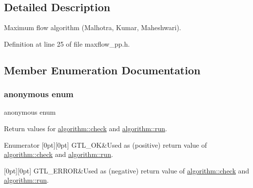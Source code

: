 \subsection{Detailed Description}
Maximum flow algorithm (Malhotra, Kumar, Maheshwari). 

Definition at line 25 of file maxflow\+\_\+pp.\+h.



\subsection{Member Enumeration Documentation}
\mbox{\label{classalgorithm_af1a0078e153aa99c24f9bdf0d97f6710}} 
\subsubsection{\texorpdfstring{anonymous enum}{anonymous enum}}
{\footnotesize\ttfamily anonymous enum\hspace{0.3cm}{\ttfamily [inherited]}}



Return values for \mbox{\hyperlink{classalgorithm_a76361fb03ad1cf643affc51821e43bed}{algorithm\+::check}} and \mbox{\hyperlink{classalgorithm_a734b189509a8d6b56b65f8ff772d43ca}{algorithm\+::run}}. 

\begin{DoxyEnumFields}{Enumerator}
[0pt][0pt]{}\mbox{\label{classalgorithm_af1a0078e153aa99c24f9bdf0d97f6710a5114c20e4a96a76b5de9f28bf15e282b}} 
G\+T\+L\+\_\+\+OK&Used as (positive) return value of \mbox{\hyperlink{classalgorithm_a76361fb03ad1cf643affc51821e43bed}{algorithm\+::check}} and \mbox{\hyperlink{classalgorithm_a734b189509a8d6b56b65f8ff772d43ca}{algorithm\+::run}}. \\
\hline

[0pt][0pt]{}\mbox{\label{classalgorithm_af1a0078e153aa99c24f9bdf0d97f6710a6fcf574690bbd6cf710837a169510dd7}} 
G\+T\+L\+\_\+\+E\+R\+R\+OR&Used as (negative) return value of \mbox{\hyperlink{classalgorithm_a76361fb03ad1cf643affc51821e43bed}{algorithm\+::check}} and \mbox{\hyperlink{classalgorithm_a734b189509a8d6b56b65f8ff772d43ca}{algorithm\+::run}}. \\
\hline

\end{DoxyEnumFields}


